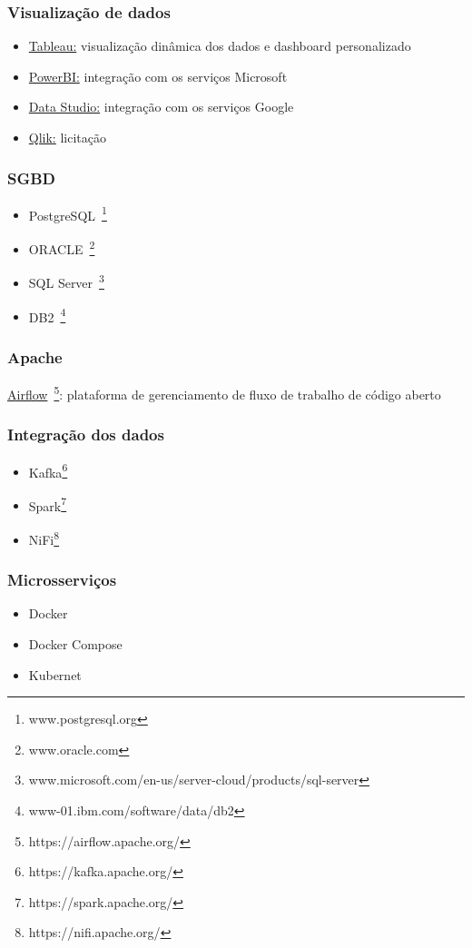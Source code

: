 \subsubsection*{Visualização de dados}
\begin{itemize} 
	\item \underline{Tableau:} visualização dinâmica dos dados e dashboard personalizado
	\item \underline{PowerBI:} integração com os serviços Microsoft
	\item \underline{Data Studio:} integração com os serviços Google
	\item \underline{Qlik:} licitação 
\end{itemize}


\subsubsection*{SGBD}
\begin{itemize}
	\item PostgreSQL~\footnote{www.postgresql.org}
	\item ORACLE~\footnote{www.oracle.com}
	\item SQL Server~\footnote{www.microsoft.com/en-us/server-cloud/products/sql-server}
	\item DB2~\footnote{www-01.ibm.com/software/data/db2}
\end{itemize}
	

\subsubsection*{Apache}
\underline{Airflow}~\footnote{https://airflow.apache.org/}: plataforma de gerenciamento de fluxo de trabalho de código aberto


\subsubsection*{Integração dos dados}
\begin{itemize}	
	\item Kafka\footnote{https://kafka.apache.org/}
	\item Spark\footnote{https://spark.apache.org/}
	\item NiFi\footnote{https://nifi.apache.org/}
\end{itemize}


\subsubsection*{Microsserviços}
\begin{itemize}	
	\item Docker
	\item Docker Compose
	\item Kubernet
\end{itemize}


